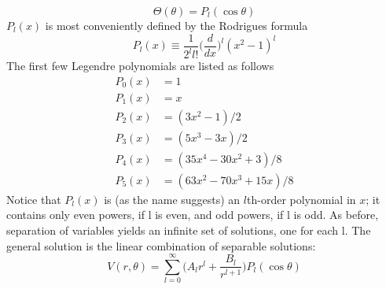 \documentclass[../../../main.tex]{subfiles}
\begin{document}
\begin{equation*}
    \Theta(\theta)=P_l(\cos\theta)
\end{equation*}
$P_l (x)$ is most conveniently defined by the Rodrigues formula
\begin{equation*}
    P_l (x)\equiv \frac{1}{2^ll!}\biggl(\frac{d}{dx}\biggr)^l(x^2-1)^l
\end{equation*}
The first few Legendre polynomials are listed as follows
\begin{align*}
    P_0(x)&=1\\
    P_1(x)&=x\\
    P_2(x)&=(3x^2-1)/2\\
    P_3(x)&=(5x^3-3x)/2\\
    P_4(x)&=(35x^4-30x^2+3)/8\\
    P_5(x)&=(63x^2-70x^3+15x)/8
\end{align*}
Notice that $P_l (x)$ is (as the name suggests) an $l$th-order polynomial in $x$; it contains only even powers, if l is even, and odd powers, if l is odd. As before, separation of variables yields an infinite set of solutions, one for each l. The general solution is the linear combination of separable solutions:
\begin{equation*}
    V(r,\theta)=\sum_{l=0}^{\infty}\biggl(A_lr^l+\frac{B_l}{r^{l+1}}\biggr)P_l (\cos\theta)
\end{equation*}
\end{document}
